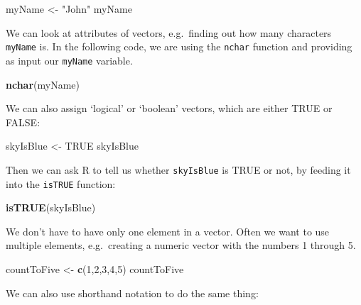\documentclass[]{article}
\newenvironment{Shaded}{\begin{snugshade}}{\end{snugshade}}
\newcommand{\DecValTok}[1]{\textcolor[rgb]{0.00,0.00,0.81}{#1}}
\newcommand{\KeywordTok}[1]{\textcolor[rgb]{0.13,0.29,0.53}{\textbf{#1}}}
\newcommand{\NormalTok}[1]{#1}
\newcommand{\OtherTok}[1]{\textcolor[rgb]{0.56,0.35,0.01}{#1}}
\newcommand{\StringTok}[1]{\textcolor[rgb]{0.31,0.60,0.02}{#1}}
\begin{document}
\begin{Shaded}
\begin{Highlighting}[]
\NormalTok{myName <-}\StringTok{ "John"}
\NormalTok{myName}
\end{Highlighting}
\end{Shaded}

We can look at attributes of vectors, e.g.~finding out how many
characters \texttt{myName} is. In the following code, we are using the
\texttt{nchar} function and providing as input our \texttt{myName}
variable.

\begin{Shaded}
\begin{Highlighting}[]
\KeywordTok{nchar}\NormalTok{(myName)}
\end{Highlighting}
\end{Shaded}

We can also assign `logical' or `boolean' vectors, which are either TRUE
or FALSE:

\begin{Shaded}
\begin{Highlighting}[]
\NormalTok{skyIsBlue <-}\StringTok{ }\OtherTok{TRUE}
\NormalTok{skyIsBlue}
\end{Highlighting}
\end{Shaded}

Then we can ask R to tell us whether \texttt{skyIsBlue} is TRUE or not,
by feeding it into the \texttt{isTRUE} function:

\begin{Shaded}
\begin{Highlighting}[]
\KeywordTok{isTRUE}\NormalTok{(skyIsBlue)}
\end{Highlighting}
\end{Shaded}

We don't have to have only one element in a vector. Often we want to use
multiple elements, e.g.~creating a numeric vector with the numbers 1
through 5.

\begin{Shaded}
\begin{Highlighting}[]
\NormalTok{countToFive <-}\StringTok{ }\KeywordTok{c}\NormalTok{(}\DecValTok{1}\NormalTok{,}\DecValTok{2}\NormalTok{,}\DecValTok{3}\NormalTok{,}\DecValTok{4}\NormalTok{,}\DecValTok{5}\NormalTok{)}
\NormalTok{countToFive}
\end{Highlighting}
\end{Shaded}

We can also use shorthand notation to do the same thing:
\end{document}
